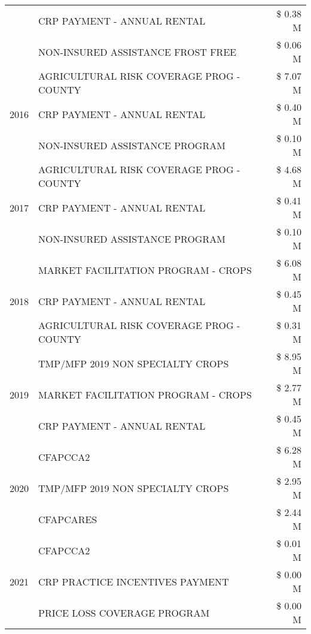 \begin{tabular}{llr}
 & CRP PAYMENT - ANNUAL RENTAL & \$ 0.38 M \\
 & NON-INSURED ASSISTANCE FROST FREE & \$ 0.06 M \\
\cline{1-3}
\multirow[t]{3}{*}{2016} & AGRICULTURAL RISK COVERAGE PROG - COUNTY & \$ 7.07 M \\
 & CRP PAYMENT - ANNUAL RENTAL & \$ 0.40 M \\
 & NON-INSURED ASSISTANCE PROGRAM & \$ 0.10 M \\
\cline{1-3}
\multirow[t]{3}{*}{2017} & AGRICULTURAL RISK COVERAGE PROG - COUNTY & \$ 4.68 M \\
 & CRP PAYMENT - ANNUAL RENTAL & \$ 0.41 M \\
 & NON-INSURED ASSISTANCE PROGRAM & \$ 0.10 M \\
\cline{1-3}
\multirow[t]{3}{*}{2018} & MARKET FACILITATION PROGRAM - CROPS & \$ 6.08 M \\
 & CRP PAYMENT - ANNUAL RENTAL & \$ 0.45 M \\
 & AGRICULTURAL RISK COVERAGE PROG - COUNTY & \$ 0.31 M \\
\cline{1-3}
\multirow[t]{3}{*}{2019} & TMP/MFP 2019 NON SPECIALTY CROPS & \$ 8.95 M \\
 & MARKET FACILITATION PROGRAM - CROPS & \$ 2.77 M \\
 & CRP PAYMENT - ANNUAL RENTAL & \$ 0.45 M \\
\cline{1-3}
\multirow[t]{3}{*}{2020} & CFAPCCA2 & \$ 6.28 M \\
 & TMP/MFP 2019 NON SPECIALTY CROPS & \$ 2.95 M \\
 & CFAPCARES & \$ 2.44 M \\
\cline{1-3}
\multirow[t]{3}{*}{2021} & CFAPCCA2 & \$ 0.01 M \\
 & CRP PRACTICE INCENTIVES PAYMENT & \$ 0.00 M \\
 & PRICE LOSS COVERAGE PROGRAM & \$ 0.00 M \\
\cline{1-3}
\bottomrule
\end{tabular}

